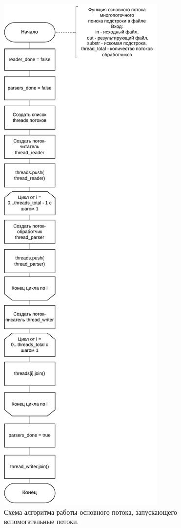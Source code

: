 \begin{figure}[h]
	\centering
	\includegraphics[height=0.9\textheight]{img/threads_main.pdf}
	\caption{Схема алгоритма работы основного потока, запускающего вспомогательные потоки.}
	\label{fig:parallel}
\end{figure}

